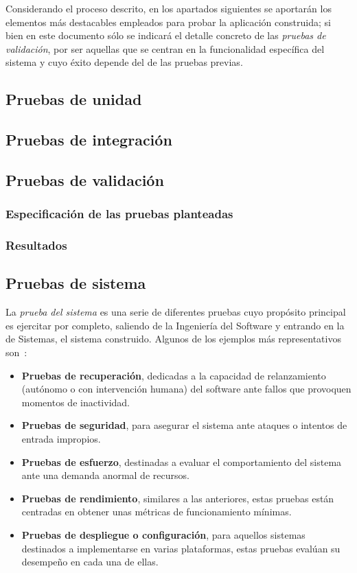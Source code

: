 Considerando el proceso descrito, en los apartados siguientes se aportarán los elementos más destacables empleados para probar la aplicación construida; si bien en este documento sólo se indicará el detalle concreto de las \emph{pruebas de validación}, por ser aquellas que se centran en la funcionalidad específica del sistema y cuyo éxito depende del de las pruebas previas.

\subsection{Pruebas de unidad}

\subsection{Pruebas de integración}

\subsection{Pruebas de validación}

\subsubsection{Especificación de las pruebas planteadas}

\subsubsection{Resultados}

\subsection{Pruebas de sistema}

La \emph{prueba del sistema} es una serie de diferentes pruebas cuyo propósito principal es ejercitar por completo, saliendo de la Ingeniería del Software y entrando en la de Sistemas, el sistema construido. Algunos de los ejemplos más representativos son~\cite{Pre10}:

\begin{itemize}
	\item \textbf{Pruebas de recuperación}, dedicadas a la capacidad de relanzamiento (autónomo o con intervención humana) del software ante fallos que provoquen momentos de inactividad.
	\item \textbf{Pruebas de seguridad}, para asegurar el sistema ante ataques o intentos de entrada impropios.
	\item \textbf{Pruebas de esfuerzo}, destinadas a evaluar el comportamiento del sistema ante una demanda anormal de recursos.
	\item \textbf{Pruebas de rendimiento}, similares a las anteriores, estas pruebas están centradas en obtener unas métricas de funcionamiento mínimas.
	\item \textbf{Pruebas de despliegue o configuración}, para aquellos sistemas destinados a implementarse en varias plataformas, estas pruebas evalúan su desempeño en cada una de ellas.
\end{itemize}

